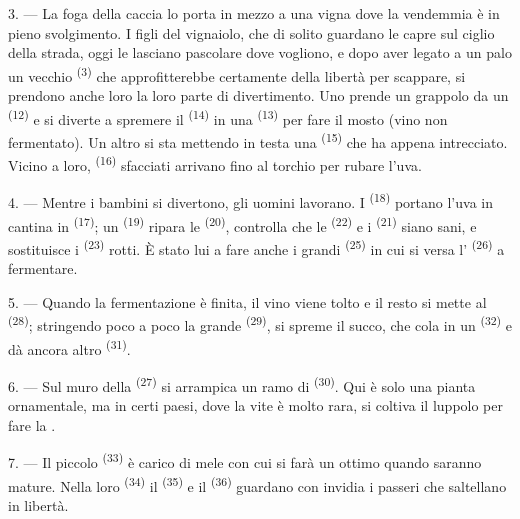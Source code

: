 3. --- La foga della caccia lo porta in mezzo a una vigna dove la vendemmia è in pieno
svolgimento. I figli del vignaiolo, che di solito guardano le capre sul ciglio della
strada, oggi le lasciano pascolare dove vogliono, e dopo aver legato a un palo un
vecchio  \textsuperscript{(3)} che approfitterebbe certamente della
libertà per scappare, si prendono anche loro la loro parte di divertimento. Uno prende
un grappolo da un  \textsuperscript{(12)} e si diverte a
spremere il  \textsuperscript{(14)} in una 
\textsuperscript{(13)} per fare il mosto (vino non fermentato). Un altro si sta
mettendo in testa una  \textsuperscript{(15)} che ha appena
intrecciato. Vicino a loro,  \textsuperscript{(16)} sfacciati arrivano
fino al torchio per rubare l'uva.

4. --- Mentre i bambini si divertono, gli uomini lavorano. I 
\textsuperscript{(18)} portano l'uva in cantina in 
\textsuperscript{(17)}; un  \textsuperscript{(19)} ripara le
 \textsuperscript{(20)}, controlla che le 
\textsuperscript{(22)} e i  \textsuperscript{(21)} siano sani, e
sostituisce i  \textsuperscript{(23)} rotti. È stato lui a fare anche i
grandi  \textsuperscript{(25)} in cui si versa l'
\textsuperscript{(26)} a fermentare.

5. --- Quando la fermentazione è finita, il vino viene tolto e il resto si mette al
 \textsuperscript{(28)}; stringendo poco a poco la grande
 \textsuperscript{(29)}, si spreme il succo, che cola in un
 \textsuperscript{(32)} e dà ancora altro 
\textsuperscript{(31)}.

\VUsaut{6.0mm}
\VUsaut{3.4mm}

6. --- Sul muro della  \textsuperscript{(27)} si arrampica un ramo di
 \textsuperscript{(30)}. Qui è solo una pianta ornamentale, ma in certi
paesi, dove la vite è molto rara, si coltiva il luppolo per fare la .

7. --- Il piccolo  \textsuperscript{(33)} è carico di mele con cui si farà
un ottimo  quando saranno mature. Nella loro 
\textsuperscript{(34)} il  \textsuperscript{(35)} e il
 \textsuperscript{(36)} guardano con invidia i passeri che
saltellano in libertà.

